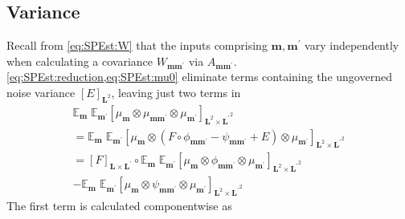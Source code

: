 \documentclass[preprint,12pt]{elsarticle}
\newcommand*{\x}{\times}
\newcommand*{\mi}[1]{\mathbf{#1}}
\newcommand*{\te}[2][]{\left\lbrack{#2}\right\rbrack_{#1}}
\newcommand*{\evt}[3][]{\mathbb{E}_{#3}^{#1}\!#2}
\begin{document}
    \subsection{Variance}\label{sub:GPEst:Variance}
        Recall from \cref{eq:SPEst:W} that the inputs comprising $\mi{m},\mi{m^{\prime}}$ vary independently when calculating a covariance $W_{\mi{m m^{\prime}}}$ via $A_{\mi{m m^{\prime}}}$. \cref{eq:SPEst:reduction,eq:SPEst:mu0} eliminate terms containing the ungoverned noise variance $\te[\mi{L}^2]{E}$, leaving just two terms in
        \begin{multline}\label{eq:GPEst:Variance}
            \evt{\;\evt{\te[\mi{L}^{2}\x \mi{L^{\prime}}^{2}]{\mu_{\mi{m}} \otimes \mu_{\mi{mm^{\prime}}} \otimes \mu_{\mi{m^{\prime}}}}}{\mi{m^{\prime}}}}{\mi{m}} \\
            = \evt{\;\evt{\te[\mi{L}^{2}\x \mi{L^{\prime}}^{2}]{\mu_{\mi{m}} \otimes (F \circ \phi_{\mi{mm^{\prime}}} - \psi_{\mi{mm^{\prime}}} + E) \otimes \mu_{\mi{m^{\prime}}}}}{\mi{m^{\prime}}}}{\mi{m}} \\
            = \te[\mi{L\x L^{\prime}}]{F} \circ \evt{\;\evt{\te[\mi{L}^{2}\x \mi{L^{\prime}}^{2}]{\mu_{\mi{m}} \otimes \phi_{\mi{mm^{\prime}}} \otimes \mu_{\mi{m^{\prime}}}}}{\mi{m^{\prime}}}}{\mi{m}} \\
            - \evt{\;\evt{\te[\mi{L}^{2}\x \mi{L^{\prime}}^{2}]{\mu_{\mi{m}} \otimes \psi_{\mi{mm^{\prime}}} \otimes \mu_{\mi{m^{\prime}}}}}{\mi{m^{\prime}}}}{\mi{m}}
        \end{multline}        
        The first term is calculated componentwise as
\end{document}
